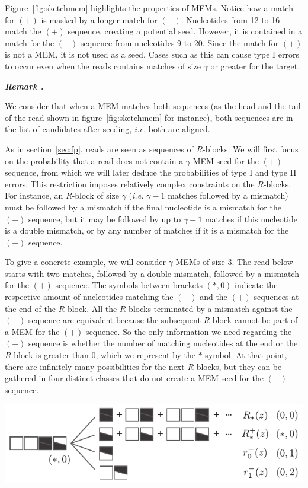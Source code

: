 \documentclass{article}
\newcounter{remarkcounter}
\newenvironment{remark}
{\small\it\vspace{0.5\baselineskip}
  \refstepcounter{remarkcounter}%
  \noindent\textbf{Remark \arabic{remarkcounter}.}%
}{\vspace{0.5\baselineskip}}
\newenvironment{inset}
{\vspace{0.5\baselineskip}\begin{center}}
{\end{center}\vspace{0.5\baselineskip}}
\begin{document}
Figure~\ref{fig:sketchmem} highlights the properties of MEMs. Notice how a
match for $(+)$ is masked by a longer match for $(-)$. Nucleotides from 12
to 16 match the $(+)$ sequence, creating a potential seed. However, it is
contained in a match for the $(-)$ sequence from nucleotides 9 to 20.
Since the match for $(+)$ is not a MEM, it is not used as a seed. Cases
such as this can cause type I errors to occur even when the reads
contains matches of size $\gamma$ or greater for the target.

\begin{remark}
We consider that when a MEM matches both sequences (as the head and the
tail of the read shown in figure~\ref{fig:sketchmem} for instance), both
sequences are in the list of candidates after seeding, \textit{i.e.} both
are aligned.
\end{remark}


As in section~\ref{sec:fp}, reads are seen as sequences of $R$-blocks. We
will first focus on the probability that a read does not contain a
$\gamma$-MEM seed for the $(+)$ sequence, from which we will later deduce
the probabilities of type I and type II errors. This restriction imposes
relatively complex constraints on the $R$-blocks. For instance, an
$R$-block of size $\gamma$ (\textit{i.e.} $\gamma-1$ matches followed by a
mismatch) must be followed by a mismatch if the final nucleotide is a
mismatch for the $(-)$ sequence, but it may be followed by up to
$\gamma-1$ matches if this nucleotide is a double mismatch, or by any
number of matches if it is a mismatch for the $(+)$ sequence.


To give a concrete example, we will consider $\gamma$-MEMs of size $3$.
The read below starts with two matches, followed by a double mismatch,
followed by a mismatch for the $(+)$ sequence. The symbols between
brackets $(*,0)$ indicate the respective amount of nucleotides matching
the $(-)$ and the $(+)$ sequences at the end of the $R$-block. All the
$R$-blocks terminated by a mismatch against the $(+)$ sequence are
equivalent because the subsequent $R$-block cannot be part of a
MEM for the $(+)$ sequence. So the only information we need regarding the
$(-)$ sequence is whether the number of matching nucleotides at the end or
the $R$-block is greater than $0$, which we represent by the $*$ symbol.
At that point, there are infinitely many possibilities for the next
$R$-blocks, but they can be gathered in four distinct classes that
do not create a MEM seed for the $(+)$ sequence.

\begin{inset}
\includegraphics[scale=0.9]{example_dual_mem.pdf}
\end{inset}
\end{document}
